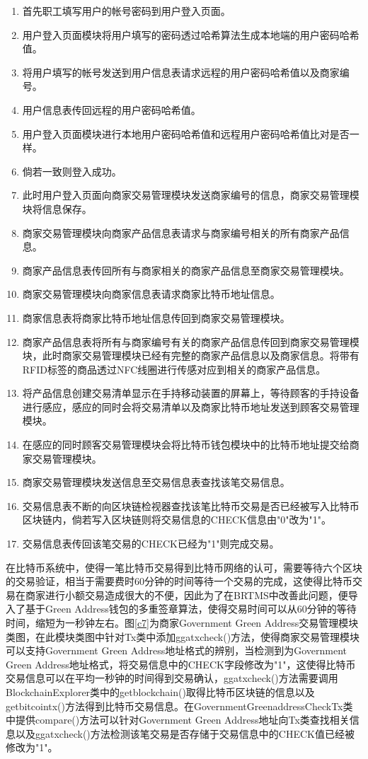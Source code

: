 	\begin{enumerate}
	\item 首先职工填写用户的帐号密码到用户登入页面。
	\item 用户登入页面模块将用户填写的密码透过哈希算法生成本地端的用户密码哈希值。
	\item 将用户填写的帐号发送到用户信息表请求远程的用户密码哈希值以及商家编号。
	\item 用户信息表传回远程的用户密码哈希值。
	\item 用户登入页面模块进行本地用户密码哈希值和远程用户密码哈希值比对是否一样。
	\item 倘若一致则登入成功。
	\item 此时用户登入页面向商家交易管理模块发送商家编号的信息，商家交易管理模块将信息保存。
	\item 商家交易管理模块向商家产品信息表请求与商家编号相关的所有商家产品信息。
	\item 商家产品信息表传回所有与商家相关的商家产品信息至商家交易管理模块。
	\item 商家交易管理模块向商家信息表请求商家比特币地址信息。
	\item 商家信息表将商家比特币地址信息传回到商家交易管理模块。
	\item 商家产品信息表将所有与商家编号有关的商家产品信息传回到商家交易管理模块，此时商家交易管理模块已经有完整的商家产品信息以及商家信息。将带有RFID标签的商品透过NFC线圈进行传感对应到相关的商家产品信息。
	\item 将产品信息创建交易清单显示在手持移动装置的屏幕上，等待顾客的手持设备进行感应，感应的同时会将交易清单以及商家比特币地址发送到顾客交易管理模块。

	\item 在感应的同时顾客交易管理模块会将比特币钱包模块中的比特币地址提交给商家交易管理模块。
	\item 商家交易管理模块发送信息至交易信息表查找该笔交易信息。
	\item 交易信息表不断的向区块链检视器查找该笔比特币交易是否已经被写入比特币区块链内，倘若写入区块链则将交易信息的CHECK信息由"0"改为"1"。
	\item 交易信息表传回该笔交易的CHECK已经为"1"则完成交易。
	
	\end{enumerate}

	在比特币系统中，使得一笔比特币交易得到比特币网络的认可，需要等待六个区块的交易验证，相当于需要费时60分钟的时间等待一个交易的完成，这使得比特币交易在商家进行小额交易造成很大的不便，因此为了在BRTMS中改善此问题，便导入了基于Green Address钱包的多重签章算法，使得交易时间可以从60分钟的等待时间，缩短为一秒钟左右。图\ref{c7}为商家Government Green Address交易管理模块类图，在此模块类图中针对Tx类中添加ggatxcheck()方法，使得商家交易管理模块可以支持Government Green Address地址格式的辨别，当检测到为Government Green Address地址格式，将交易信息中的CHECK字段修改为"1"，这使得比特币交易信息可以在平均一秒钟的时间得到交易确认，ggatxcheck()方法需要调用BlockchainExplorer类中的getblockchain()取得比特币区块链的信息以及getbitcointx()方法得到比特币交易信息。在GovernmentGreenaddressCheckTx类中提供compare()方法可以针对Government Green Address地址向Tx类查找相关信息以及ggatxcheck()方法检测该笔交易是否存储于交易信息中的CHECK值已经被修改为"1"。

